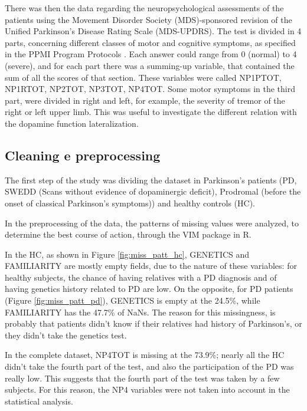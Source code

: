 \documentclass[]{article}
\begin{document}
\begin{multicols}{2}
There was then the data regarding the neuropsychological assessments of the patients using the Movement Disorder Society (MDS)-sponsored revision of the Unified Parkinson's Disease Rating Scale (MDS-UPDRS). The test is divided in 4 parts, concerning different classes of motor and cognitive symptoms, as specified in the PPMI Program Protocols \cite{marek_parkinsons_2018}. Each answer could range from 0 (normal) to 4 (severe), and for each part there was a summing-up variable, that contained the sum of all the scores of that section. These variables were called NP1PTOT, NP1RTOT, NP2TOT, NP3TOT, NP4TOT. Some motor symptoms in the third part, were divided in right and left, for example, the severity of tremor of the right or left upper limb. This was useful to investigate the different relation with the dopamine function lateralization.
\newline

\subsection{Cleaning e preprocessing}

The first step of the study was dividing the dataset in Parkinson's patients (PD, SWEDD (Scans without evidence of dopaminergic deficit), Prodromal (before the onset of classical Parkinson's symptoms)) and healthy controls (HC).

In the preprocessing of the data, the patterns of missing values were analyzed, to determine the best course of action, through the VIM package in R.

In the HC, as shown in Figure \ref{fig:miss_patt_hc}, GENETICS and FAMILIARITY are mostly empty fields, due to the nature of these variables: for healthy subjects, the chance of having relatives with a PD diagnosis and of having genetics history related to PD are low. On the opposite, for PD patients (Figure \ref{fig:miss_patt_pd}), GENETICS is empty at the 24.5\%, while FAMILIARITY has the 47.7\% of NaNs. The reason for this missingness, is probably that patients didn't know if their relatives had history of Parkinson's, or they didn't take the genetics test. 

In the complete dataset, NP4TOT is missing at the 73.9\%; nearly all the HC didn't take the fourth part of the test, and also the participation of the PD was really low. This suggests that the fourth part of the test was taken by a few subjects. For this reason, the NP4 variables were not taken into account in the statistical analysis.


\end{multicols}
\end{document}
